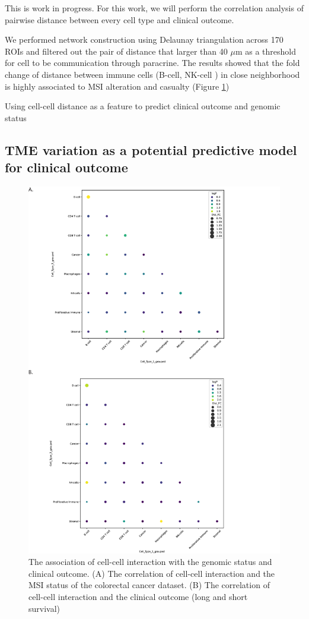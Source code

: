 This is work in progress. For this work, we will perform the correlation analysis of pairwise distance between every cell type and clinical outcome. 

We performed network construction using Delaunay triangulation across 170 ROIs and filtered out the pair of distance that larger than 40 $\mu$m as a threshold for cell to be communication through paracrine. The results showed that the fold change of distance between immune cells (B-cell, NK-cell ) in close neighborhood is highly associated to MSI alteration and casualty (Figure \ref{Chap4:fig2})

Using cell-cell distance as a feature to predict clinical outcome and genomic status

\subsection{TME variation as a potential predictive model for clinical outcome}
\begin{figure}
    \centering
    \includegraphics[width=0.8\columnwidth]{Chapter4/Figures/Chap4_figure1.png}
    \caption[The association of cell-cell interaction with the genomic status and clinical outcome]{The association of cell-cell interaction with the genomic status and clinical outcome. (A) The correlation of cell-cell interaction and the MSI status of the colorectal cancer dataset. (B) The correlation of cell-cell interaction and the clinical outcome (long and short survival)}
    \label{Chap4:fig2}
    
\end{figure}
